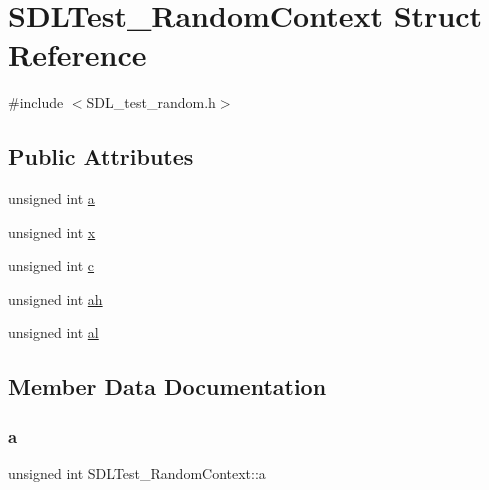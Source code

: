 \hypertarget{struct_s_d_l_test___random_context}{}\section{S\+D\+L\+Test\+\_\+\+Random\+Context Struct Reference}
\label{struct_s_d_l_test___random_context}


{\ttfamily \#include $<$S\+D\+L\+\_\+test\+\_\+random.\+h$>$}

\subsection*{Public Attributes}
\begin{DoxyCompactItemize}
\item 
unsigned int \hyperlink{struct_s_d_l_test___random_context_a24f830d6cb476c96fbe325c99331e45f}{a}
\item 
unsigned int \hyperlink{struct_s_d_l_test___random_context_a8bd6d1b4e1677ed1c06f5cc09f1af5b6}{x}
\item 
unsigned int \hyperlink{struct_s_d_l_test___random_context_a17a6a7e7b68a33c67d9b74c8c7c33198}{c}
\item 
unsigned int \hyperlink{struct_s_d_l_test___random_context_a2c8d2f1ee16cdfd38361b8f03b3fdb85}{ah}
\item 
unsigned int \hyperlink{struct_s_d_l_test___random_context_a0e2bccd3611d383d6510c6c828aa54c4}{al}
\end{DoxyCompactItemize}


\subsection{Member Data Documentation}
\mbox{\label{struct_s_d_l_test___random_context_a24f830d6cb476c96fbe325c99331e45f}} 
\subsubsection{\texorpdfstring{a}{a}}
{\footnotesize\ttfamily unsigned int S\+D\+L\+Test\+\_\+\+Random\+Context\+::a}

\mbox{\label{struct_s_d_l_test___random_context_a2c8d2f1ee16cdfd38361b8f03b3fdb85}} 
